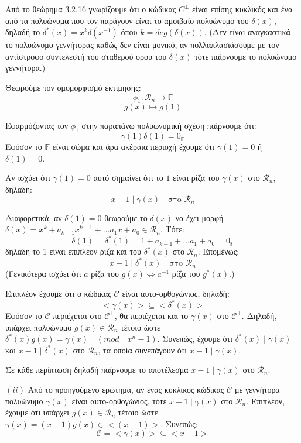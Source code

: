 \documentclass[oneside,a4paper]{article}
\newcommand{\C}{\mathcal{C}}
\begin{document}
\begin{enumerate}
		Από το θεώρημα 3.2.16 γνωρίζουμε ότι ο κώδικας $C^{\perp}$ είναι επίσης κυκλικός και ένα από τα πολυώνυμα που τον παράγουν είναι το αμοιβαίο πολυώνυμο του $\delta (x)$, δηλαδή το $\delta^* (x) = x^k \delta (x^{-1} )$ όπου $k = deg\left( \delta (x) \right) $. (Δεν είναι αναγκαστικά το πολυώνυμο γεννήτορας καθώς δεν είναι μονικό, αν πολλαπλασιάσουμε με τον αντίστροφο συντελεστή του σταθερού όρου του $\delta (x)$ τότε παίρνουμε το πολυώνυμο γεννήτορα.)

		Θεωρούμε τον ομομορφισμό εκτίμησης: 
		$$\phi_1 : \mathcal{R}_n \longrightarrow \mathbb{F} $$
		$$g(x) \longmapsto g(1)$$

		Εφαρμόζοντας τον $\phi_1$ στην παραπάνω πολυωνυμική σχέση παίρνουμε ότι:
		$$ \gamma (1) \delta (1) = 0_{\mathbb{F}}$$
		Εφόσον το $\mathbb{F}$ είναι σώμα και άρα ακέραια περιοχή έχουμε ότι $\gamma (1) = 0$ ή $\delta (1) = 0$.

		Αν ισχύει ότι $\gamma (1) = 0$ αυτό σημαίνει ότι το $1$ είναι ρίζα του $\gamma (x)$ στο $\mathcal{R}_n$, δηλαδή:
		$$x-1 \mid \gamma(x) \quad\text{στο } \mathcal{R}_n$$

		Διαφορετικά, αν $\delta(1) = 0$ θεωρούμε το $\delta (x)$ να έχει μορφή $\delta (x) = x^k + a_{k-1} x^{k-1} + \ldots a_1 x + a_0 \in \mathcal{R}_n$. Τότε:
		$$\delta (1) = \delta^* (1) = 1 + a_{k-1} + \ldots a_1 + a_0 = 0_{\mathbb{F}}$$
		δηλαδή το 1 είναι επιπλέον ρίζα και του $\delta^* (x)$ στο $\mathcal{R}_n$. Επομένως:
		$$x-1 \mid \delta^* (x) \quad \text{στο } \mathcal{R}_n$$
		(Γενικότερα ισχύει ότι $a$ ρίζα του $g(x) \iff a^{-1}$ ρίζα του $g^* (x)$.)

		Επιπλέον έχουμε ότι ο κώδικας $\C$ είναι αυτο-ορθογώνιος, δηλαδή:
		$$ <\gamma (x) > \subseteq <\delta^* (x)>$$
		Εφόσον το $\C$ περιέχεται στο $\C^{\perp}$, θα περιέχεται και το $\gamma (x)$ στο $\C^{\perp}$. Δηλαδή, υπάρχει πολυώνυμο $g(x) \in \mathcal{R}_n$ τέτοιο ώστε $\delta^* (x) g(x) = \gamma (x) \quad (mod\quad  x^n -1)$. Συνεπώς, έχουμε ότι  $\delta^* (x) \mid \gamma (x)$ και $x-1 \mid \delta^* (x)$ στο $\mathcal{R}_n$, τα οποία συνεπάγουν ότι $x-1 \mid \gamma (x)$.
		$ $\newline

		Σε κάθε περίπτωση δηλαδή παίρνουμε το αποτέλεσμα $x-1 \mid \gamma (x)$ στο $\mathcal{R}_n$.

		\pagebreak

		$(ii)$ Από το προηγούμενο ερώτημα, αν ένας κυκλικός κώδικας $\C$ με γεννήτορα πολυώνυμο $\gamma (x)$ είναι αυτο-ορθογώνιος, τότε $x-1 \mid \gamma (x)$ στο $\mathcal{R}_n$. Επιπλέον, έχουμε ότι υπάρχει $g(x) \in \mathcal{R}_n$ τέτοιο ώστε $\gamma (x) = (x-1)g(x) \in <(x-1)>$. Συνεπώς:
		$$ \C = <\gamma (x) > \subseteq < x-1 >$$


\end{enumerate}
\end{document}
